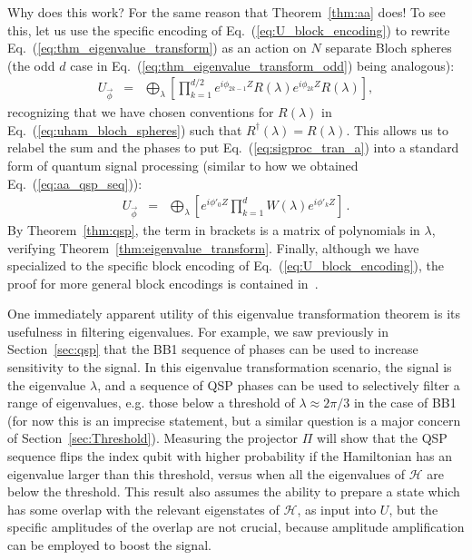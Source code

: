 \documentclass[aps,pra,showpacs,notitlepage,twocolumn,superscriptaddress,nofootinbib]{revtex4-1}
\newcommand{\bea}{\begin{eqnarray}}
\newcommand{\eea}{\end{eqnarray}}
\begin{document}
Why does this work?  For the same reason that Theorem~{\ref{thm:aa}} does! To see this, let us use the specific encoding of Eq.~(\ref{eq:U_block_encoding}) to rewrite Eq.~(\ref{eq:thm_eigenvalue_transform}) as an action on $N$ separate Bloch spheres (the odd $d$ case in Eq.~(\ref{eq:thm_eigenvalue_transform_odd}) being analogous):
    \bea
        U_{\vec\phi} &=& \bigoplus_\lambda \left[ \prod_{k=1}^{d/2} e^{i\phi_{2k-1}Z} R(\lambda) e^{i\phi_{2k}Z} R(\lambda) \right],
        \label{eq:sigproc_tran_a}
    \eea
recognizing that we have chosen conventions for $R(\lambda)$ in Eq.~(\ref{eq:uham_bloch_spheres}) such that $R^\dagger(\lambda) = R(\lambda)$. This allows us to relabel the sum and the phases to put Eq.~(\ref{eq:sigproc_tran_a}) into a standard form of quantum signal processing (similar to how we obtained Eq.~(\ref{eq:aa_qsp_seq})):
    \bea
        U_{\vec\phi} &=& \bigoplus_\lambda \left[ e^{i\phi'_0 Z} \prod_{k=1}^{d} W(\lambda) e^{i\phi'_{k}Z} \right] 
        \label{eq:sigproc_tran_b}
        \,.
    \eea
By Theorem~\ref{thm:qsp}, the term in brackets is a matrix of polynomials in $\lambda$, verifying Theorem~\ref{thm:eigenvalue_transform}. Finally, although we have specialized to the specific block encoding of Eq.~(\ref{eq:U_block_encoding}), the proof for more general block encodings is contained in~\cite{Gily_n_2019, Low_2019}.

One immediately apparent utility of this eigenvalue transformation theorem is its usefulness in filtering eigenvalues. For example, we saw previously in Section~\ref{sec:qsp} that the BB1 sequence of phases can be used to increase sensitivity to the signal. In this eigenvalue transformation scenario, the signal is the eigenvalue $\lambda$, and a sequence of QSP phases can be used to selectively filter a range of eigenvalues, e.g. those below a threshold of $\lambda \approx 2\pi/3$ in the case of BB1 (for now this is an imprecise statement, but a similar question is a major concern of Section~\ref{sec:Threshold}). Measuring the projector $\Pi$ will show that the QSP sequence flips the index qubit with higher probability if the Hamiltonian has an eigenvalue larger than this threshold, versus when all the eigenvalues of $\mathcal{H}$ are below the threshold. This result also assumes the ability to prepare a state which has some overlap with the relevant eigenstates of $\mathcal{H}$, as input into $U$, but the specific amplitudes of the overlap are not crucial, because amplitude amplification can be employed to boost the signal.


\end{document}

